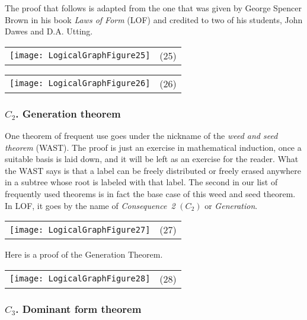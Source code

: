 \documentclass[12pt]{article}
\begin{document}
The proof that follows is adapted from the one that was given by George Spencer Brown in his book \textit{Laws of Form} (LOF) and credited to two of his students, John Dawes and D.A. Utting.

\begin{center}\begin{tabular}{cc}
\texttt{[image: LogicalGraphFigure25]} & (25)
\end{tabular}\end{center}

\begin{center}\begin{tabular}{cc}
\texttt{[image: LogicalGraphFigure26]} & (26)
\end{tabular}\end{center}

\subsubsection{$C_2$.  Generation theorem}

One theorem of frequent use goes under the nickname of the \textit{weed and seed theorem} (WAST).  The proof is just an exercise in mathematical induction, once a suitable basis is laid down, and it will be left as an exercise for the reader.  What the WAST says is that a label can be freely distributed or freely erased anywhere in a subtree whose root is labeled with that label.  The second in our list of frequently used theorems is in fact the base case of this weed and seed theorem.  In LOF, it goes by the name of \textit{Consequence~2} $(C_2)$ or \textit{Generation}.

\begin{center}\begin{tabular}{cc}
\texttt{[image: LogicalGraphFigure27]} & (27)
\end{tabular}\end{center}

Here is a proof of the Generation Theorem.

\begin{center}\begin{tabular}{cc}
\texttt{[image: LogicalGraphFigure28]} & (28)
\end{tabular}\end{center}

\subsubsection{$C_3$.  Dominant form theorem}
\end{document}
